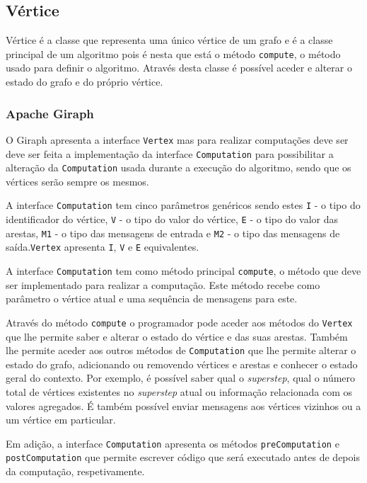 \newpage
\subsection{Vértice}
\label{ss:vert}
Vértice é a classe que representa uma único vértice de um grafo e é a classe principal de um algoritmo pois é nesta que está o método \texttt{compute}, o método usado para definir o algoritmo. Através desta classe é possível aceder e alterar o estado do grafo e do próprio vértice.
\subsubsection*{Apache Giraph}


O Giraph apresenta a interface \texttt{Vertex} mas para realizar computações deve ser deve ser feita a implementação da interface \texttt{Computation} para possibilitar a alteração da \texttt{Computation} usada durante a execução do algoritmo, sendo que os vértices serão sempre os mesmos.

A interface \texttt{Computation} tem cinco parâmetros genéricos sendo estes \texttt{I} - o tipo do identificador do vértice, \texttt{V} - o tipo do valor do vértice, \texttt{E} - o tipo do valor das arestas, \texttt{M1} - o tipo das mensagens de entrada e \texttt{M2} - o tipo das mensagens de saída.\texttt{Vertex} apresenta \texttt{I}, \texttt{V} e \texttt{E} equivalentes.

A interface \texttt{Computation} tem como método principal \texttt{compute}, o método que deve ser implementado para realizar a computação. Este método recebe como parâmetro o vértice atual e uma sequência de mensagens para este.

Através do método \texttt{compute} o programador pode aceder aos métodos do \texttt{Vertex} que lhe permite saber e alterar o estado do vértice e das suas arestas. Também lhe permite aceder aos outros métodos de \texttt{Computation} que lhe permite alterar o estado do grafo, adicionando ou removendo vértices e arestas e conhecer o estado geral do contexto. Por exemplo, é possível saber qual o \textit{superstep}, qual o número total de vértices existentes no \textit{superstep} atual ou informação relacionada com os valores agregados. É também possível enviar mensagens aos vértices vizinhos ou a um vértice em particular.

Em adição, a interface \texttt{Computation} apresenta os métodos \texttt{preComputation} e \texttt{postComputation} que permite escrever código que será executado antes de depois da computação, respetivamente.


